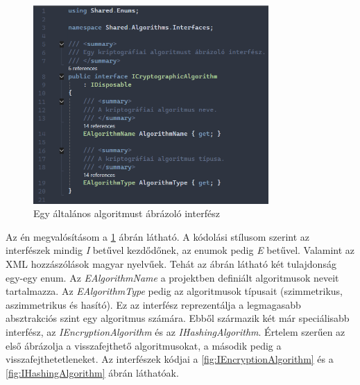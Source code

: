 \documentclass[12pt]{report} %
\begin{document}
\begin{figure}[H]
    \centering %
    \includegraphics[width=0.8\textwidth]{Figures/ICryptographicAlgorithm.png} %
    \caption{Egy általános algoritmust ábrázoló interfész} %
    \label{fig:ICryptographicAlgorithm} %
\end{figure}

Az én megvalósításom a \ref{fig:ICryptographicAlgorithm} ábrán látható. A kódolási stílusom szerint az interfészek mindig \textit{I} betűvel kezdődőnek, az enumok pedig \textit{E} betűvel. Valamint az XML hozzászólások magyar nyelvűek. Tehát az ábrán látható két tulajdonság egy-egy enum. Az \textit{EAlgorithmName} a projektben definiált algoritmusok neveit tartalmazza. Az \textit{EAlgorithmType} pedig az algoritmusok típusait (szimmetrikus, aszimmetrikus és hasító). Ez az interfész reprezentálja a legmagasabb absztrakciós szint egy algoritmus számára. Ebből származik két már speciálisabb interfész, az \textit{IEncryptionAlgorithm} és az \textit{IHashingAlgorithm}. Értelem szerűen az első ábrázolja a visszafejthető algoritmusokat, a második pedig a visszafejthetetleneket. Az interfészek kódjai a \ref{fig:IEncryptionAlgorithm} és a \ref{fig:IHashingAlgorithm} ábrán láthatóak.
\end{document}
